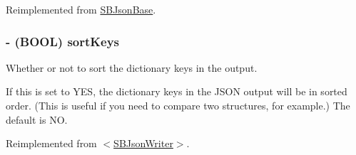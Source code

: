 \-Reimplemented from \hyperlink{interface_s_b_json_base_abe3e47517711570a9a57e2d92a15055b}{\-S\-B\-Json\-Base}.

\hypertarget{interface_s_b_json_writer_af25807a58a322b56cb5d3593532228e5}{
\subsubsection[{sort\-Keys}]{\setlength{\rightskip}{0pt plus 5cm}-\/ (\-B\-O\-O\-L) sort\-Keys}}
\label{interface_s_b_json_writer_af25807a58a322b56cb5d3593532228e5}


\-Whether or not to sort the dictionary keys in the output. 

\-If this is set to \-Y\-E\-S, the dictionary keys in the \-J\-S\-O\-N output will be in sorted order. (\-This is useful if you need to compare two structures, for example.) \-The default is \-N\-O. 

\-Reimplemented from \hyperlink{protocol_s_b_json_writer-p_ad424f1c19aead35d04509bfa549f7290}{$<$\-S\-B\-Json\-Writer$>$}.



